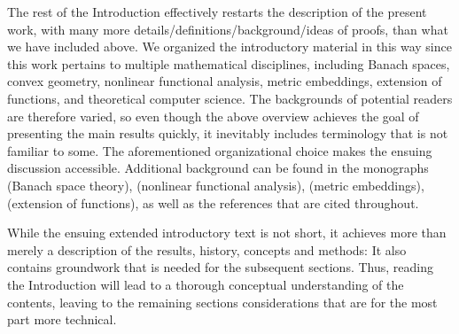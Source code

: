 \documentclass[11pt,reqno]{amsart}
\theoremstyle{remark}
\renewcommand{\1}{\mathbf 1}
\begin{document}
\bigskip
{} The rest of the Introduction  effectively restarts the description of the present work, with many more details/definitions/background/ideas of proofs, than what we have included above. We organized the introductory material in this way since this work pertains to multiple mathematical disciplines, including Banach spaces, convex geometry, nonlinear functional analysis, metric embeddings, extension of functions, and theoretical computer science. The backgrounds of potential readers are therefore  varied, so even though the above overview achieves the goal of presenting the main results quickly, it inevitably includes  terminology that is not familiar to some. The aforementioned organizational choice makes the ensuing discussion accessible.  Additional background can be found in the  monographs~\cite{LT77,MS86,Tom89} (Banach space theory), \cite{BL00} (nonlinear functional analysis), \cite{Mat02,Ost13} (metric embeddings), \cite{BB12} (extension of functions), as well as the references that are cited throughout.


While the ensuing extended introductory text is not short, it achieves more than merely a description of the results, history, concepts and methods: It also contains groundwork that is needed for the subsequent sections. Thus, reading the Introduction will lead to a thorough conceptual understanding of the contents, leaving to the remaining sections considerations that are for the most part more technical.
\end{document}
